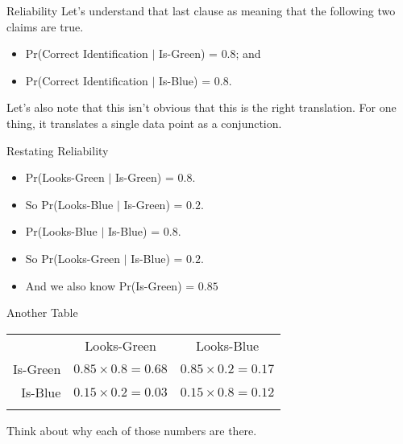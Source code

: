 \documentclass[
  ignorenonframetext,
]{beamer}
\providecommand{\tightlist}{%
  \setlength{\itemsep}{0pt}\setlength{\parskip}{0pt}}
\renewcommand{\,}{\text{, }}
\begin{document}
\begin{frame}{Reliability}
\protect\hypertarget{reliability}{}
Let's understand that last clause as meaning that the following two
claims are true.

\begin{itemize}
\tightlist
\item
  Pr(Correct Identification \(|\) Is-Green) = \(0.8\); and
\item
  Pr(Correct Identification \(|\) Is-Blue) = \(0.8\).
\end{itemize}

Let's also note that this isn't obvious that this is the right
translation. For one thing, it translates a single data point as a
conjunction.
\end{frame}

\begin{frame}{Restating Reliability}
\protect\hypertarget{restating-reliability}{}
\begin{itemize}[<+->]
\tightlist
\item
  Pr(Looks-Green \(|\) Is-Green) = \(0.8\).
\item
  So Pr(Looks-Blue \(|\) Is-Green) = \(0.2\).
\end{itemize}

\begin{itemize}[<+->]
\tightlist
\item
  Pr(Looks-Blue \(|\) Is-Blue) = \(0.8\).
\item
  So Pr(Looks-Green \(|\) Is-Blue) = \(0.2\).
\end{itemize}

\begin{itemize}[<+->]
\tightlist
\item
  And we also know Pr(Is-Green) = \(0.85\)
\end{itemize}
\end{frame}

\begin{frame}{Another Table}
\protect\hypertarget{another-table}{}
\begin{longtable}[]{@{}rcc@{}}
\toprule
& Looks-Green & Looks-Blue \\ \addlinespace
\midrule
\endhead
Is-Green & \(0.85 \times 0.8 = 0.68\) &
\(0.85 \times 0.2 = 0.17\) \\ \addlinespace
Is-Blue & \(0.15 \times 0.2 = 0.03\) &
\(0.15 \times 0.8 = 0.12\) \\ \addlinespace
\bottomrule
\end{longtable}

Think about why each of those numbers are there.
\end{frame}
\end{document}
